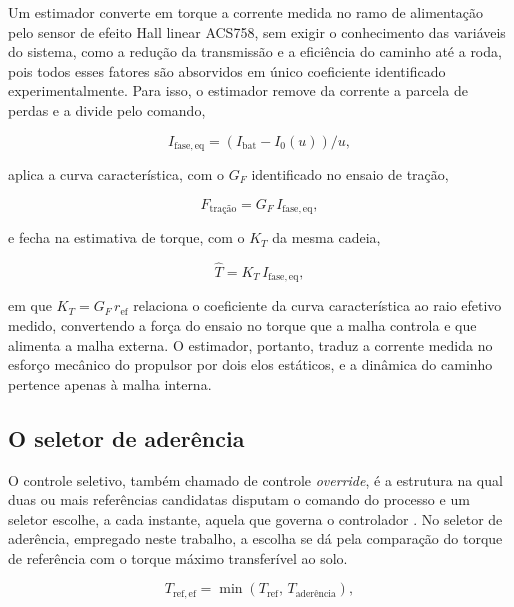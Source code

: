 Um estimador converte em torque a corrente medida no ramo de alimentação pelo sensor de
efeito Hall linear ACS758, sem exigir o conhecimento das variáveis do
sistema, como a redução da transmissão e a eficiência do caminho até a roda, pois todos
esses fatores são absorvidos em único coeficiente identificado experimentalmente. Para
isso, o estimador remove da corrente a parcela de perdas e a divide pelo comando,

\begin{equation}\label{eq:corrente_fase}
I_{\mathrm{fase,eq}} = (I_{\mathrm{bat}} - I_0(u))/u,
\end{equation}

aplica a curva característica, com o $G_F$ identificado no ensaio de tração,

\begin{equation}\label{eq:curva_caracteristica}
F_{\text{tra\c{c}\~{a}o}} = G_F\,I_{\mathrm{fase,eq}},
\end{equation}

e fecha na estimativa de torque, com o $K_T$ da mesma cadeia,

\begin{equation}\label{eq:estimador_proposta}
\hat{T} = K_T\,I_{\mathrm{fase,eq}},
\end{equation}

em que $K_T = G_F\,r_{\mathrm{ef}}$ relaciona o coeficiente da curva característica ao
raio efetivo medido, convertendo a força do ensaio no torque que a malha controla e que
alimenta a malha externa. O estimador, portanto, traduz a corrente medida no esforço
mecânico do propulsor por dois elos estáticos, e a dinâmica do caminho pertence apenas à
malha interna.

\subsection{O seletor de aderência}
\label{sec:seletor}

O controle seletivo, também chamado de controle \emph{override}, é a estrutura na qual
duas ou mais referências candidatas disputam o comando do processo e um seletor
escolhe, a cada instante, aquela que governa o controlador \cite{raffo_tcpi_cascata}.
No seletor de aderência, empregado neste trabalho, a escolha se dá pela comparação do torque
de referência com o torque máximo transferível ao solo.

\begin{equation}\label{eq:seletor}
T_{\mathrm{ref,ef}} = \min\left(T_{\mathrm{ref}},\,T_{\text{ader\^{e}ncia}}\right),
\end{equation}

